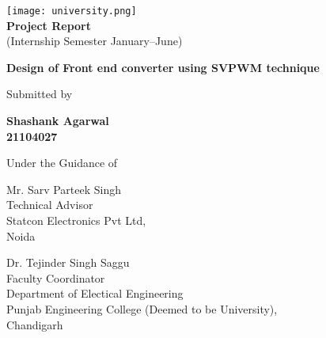 \begin{titlepage}
    \begin{center}
        \texttt{[image: university.png]}\\
        {\textbf{Project Report}}\\
        \vspace*{0.2cm}
        (Internship Semester January--June)

        \vspace*{3cm}
        {\Large\textbf {Design of Front end converter using SVPWM technique}}

        \vfill
        Submitted by

        \vfill
        \textbf{
        Shashank Agarwal\\
        21104027
        }

        \vfill
        Under the Guidance of
    \end{center}
    \vfill

    \noindent
    \begin{minipage}[t]{0.5\textwidth}
        \raggedright
        Mr. Sarv Parteek Singh\\
        Technical Advisor\\
        Statcon Electronics Pvt Ltd,\\
        Noida
    \end{minipage}
    \hfill
    \begin{minipage}[t]{0.5\textwidth}
        \raggedleft
        Dr. Tejinder Singh Saggu\\
        Faculty Coordinator\\
        Department of Electical Engineering\\
        Punjab Engineering College (Deemed to be University),\\
        Chandigarh
    \end{minipage}
\end{titlepage}